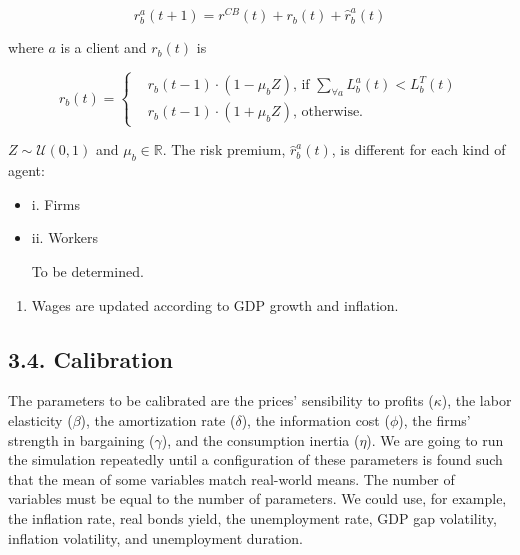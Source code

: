 \documentclass[11pt,]{article}
\providecommand{\tightlist}{%
\setlength{\itemsep}{0pt}\setlength{\parskip}{0pt}}
\begin{document}
\begin{equation}
  r_b^a(t+1) = r^{CB}(t) + r_b(t) + \hat{r}_b^a(t)
\end{equation}

where \(a\) is a client and \(r_b(t)\) is

\begin{equation}
  r_b(t) = 
  \begin{cases}
    & r_b(t-1) \cdot (1 - \mu_b Z)  \text{, if } \sum_{\forall a} L_b^a(t) < L_b^T(t) \\
    & r_b(t-1) \cdot (1 + \mu_b Z) \text{, otherwise.}
  \end{cases}
\end{equation}

\(Z \sim \mathcal{U}(0,1)\) and \(\mu_b \in \mathbb{R}\). The risk
premium, \(\hat{r}_b^a(t)\), is different for each kind of agent:

\begin{itemize}
  \item[] i. Firms
  
  
  \item[] ii. Workers
  
  To be determined.
  
\end{itemize}

\begin{enumerate}
\def\labelenumi{\alph{enumi}.}
\setcounter{enumi}{4}
\tightlist
\item
  Wages are updated according to GDP growth and inflation.
\end{enumerate}

\subsection{3.4. Calibration}\label{calibration}

The parameters to be calibrated are the prices' sensibility to profits
(\(\kappa\)), the labor elasticity (\(\beta\)), the amortization rate
(\(\delta\)), the information cost (\(\phi\)), the firms' strength in
bargaining (\(\gamma\)), and the consumption inertia (\(\eta\)). We are
going to run the simulation repeatedly until a configuration of these
parameters is found such that the mean of some variables match
real-world means. The number of variables must be equal to the number of
parameters. We could use, for example, the inflation rate, real bonds
yield, the unemployment rate, GDP gap volatility, inflation volatility,
and unemployment duration.
\end{document}
